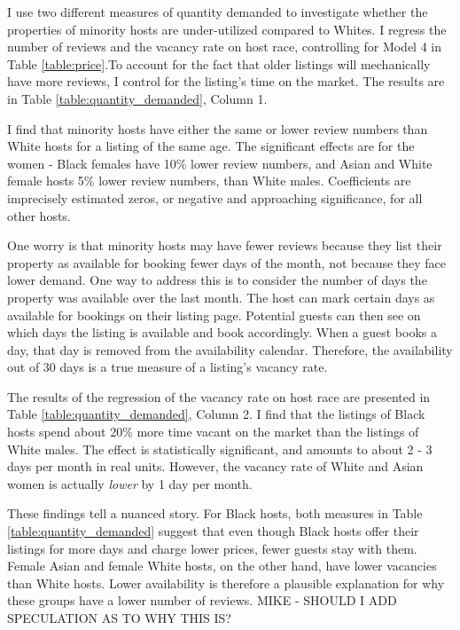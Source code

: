 I use two different measures of quantity demanded to investigate whether the properties of minority hosts are under-utilized compared to Whites. I regress the number of reviews and the vacancy rate on host race, controlling for Model 4 in Table \ref{table:price}.To account for the fact that older listings will mechanically have more reviews, I control for the listing's time on the market. The results are in Table \ref{table:quantity_demanded}, Column 1. 

I find that minority hosts have either the same or lower review numbers than White hosts for a listing of the same age. The significant effects are for the women - Black females have 10\% lower review numbers, and Asian and White female hosts 5\% lower review numbers, than White males. Coefficients are imprecisely estimated zeros, or negative and approaching significance, for all other hosts. 

One worry is that minority hosts may have fewer reviews because they list their property as available for booking fewer days of the month, not because they face lower demand. One way to address this is to consider the number of days the property was available over the last month. The host can mark certain days as available for bookings on their listing page. Potential guests can then see on which days the listing is available and book accordingly. When a guest books a day, that day is removed from the availability calendar. Therefore, the availability out of 30 days is a true measure of a listing's vacancy rate. 

The results of the regression of the vacancy rate on host race are presented in Table \ref{table:quantity_demanded}, Column 2. I find that the listings of Black hosts spend about 20\% more time vacant on the market than the listings of White males. The effect is statistically significant, and amounts to about 2 - 3 days per month in real units. However, the vacancy rate of White and Asian women is actually \textit{lower} by 1 day per month. %

These findings tell a nuanced story. For Black hosts, both measures in Table \ref{table:quantity_demanded} suggest that even though Black hosts offer their listings for more days and charge lower prices, fewer guests stay with them. Female Asian and female White hosts, on the other hand, have lower vacancies than White hosts. Lower availability is therefore a plausible explanation for why these groups have a lower number of reviews. MIKE - SHOULD I ADD SPECULATION AS TO WHY THIS IS?

